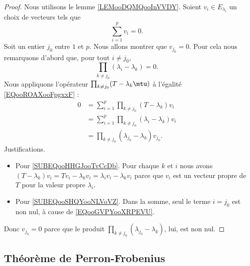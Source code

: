\begin{proof}
	Nous utilisons le lemme \ref{LEMooDQMQooInVVDY}. Soient \( v_i\in E_{\lambda_i}\) un choix de vecteurs tels que
	\begin{equation}        \label{EQooROAXooFpgxxF}
		\sum_{i=1}^pv_i=0.
	\end{equation}
	Soit un entier \( j_0\) entre \( 1\) et \( p\). Nous allons montrer que \( v_{j_0}=0\). Pour cela nous remarquons d'abord que, pour tout \( i\neq j_0\),
	\begin{equation}        \label{EQooGVPYooXRPEVU}
		\prod_{k\neq j_0}(\lambda_i-\lambda_k)=0.
	\end{equation}
	Nous appliquons l'opérateur \( \prod_{k\neq j_0}(T-\lambda_k\mtu)\) à l'égalité \eqref{EQooROAXooFpgxxF} :
	\begin{subequations}
		\begin{align}
			0 & = \sum_{i=1}^p\prod_{k\neq j_0}(T-\lambda_k)v_i                                                   \\
			  & = \sum_{i=1}^p\prod_{k\neq j_0}(\lambda_i-\lambda_k)v_i       \label{SUBEQooHHGJooTvCcDb}         \\
			  & = \prod_{k\neq j_0}(\lambda_{j_0}-\lambda_k)v_{j_0}.                  \label{SUBEQooSHQYooNLVoVZ}
		\end{align}
	\end{subequations}
	Justifications.
	\begin{itemize}
		\item Pour \eqref{SUBEQooHHGJooTvCcDb}. Pour chaque \( k\) et \( i\) nous avons \( (T-\lambda_k)v_i=Tv_i-\lambda_kv_i=\lambda_iv_i-\lambda_kv_i\) parce que \( v_i\) est un vecteur propre de \( T\) pour la valeur propre \( \lambda_i\).
		\item Pour \eqref{SUBEQooSHQYooNLVoVZ}. Dans la somme, seul le terme \( i=j_0\) est non nul, à cause de \eqref{EQooGVPYooXRPEVU}.
	\end{itemize}
	Donc \( v_{j_0}=0\) parce que le produit \( \prod_{k\neq j_0}(\lambda_{j_0}-\lambda_k)\), lui, est non nul.
\end{proof}


\subsection{Théorème de Perron-Frobenius}

